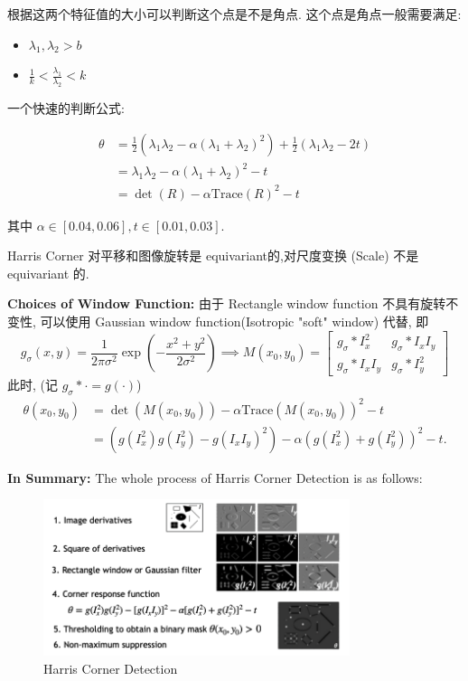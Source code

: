 根据这两个特征值的大小可以判断这个点是不是角点. 这个点是角点一般需要满足:

\begin{itemize}
    \item $\lambda_1, \lambda_2>b$
    \item $\frac{1}{k}<\frac{\lambda_1}{\lambda_2}<k$
\end{itemize}

一个快速的判断公式:

\begin{equation}
\begin{aligned}
\theta&=\frac 12(\lambda_1\lambda_2-\alpha(\lambda_1+\lambda_2)^2)+\frac12(\lambda_1\lambda_2-2t)\\
&=\lambda_1\lambda_2-\alpha(\lambda_1+\lambda_2)^2-t\\
&=\det(R)-\alpha\text{Trace}(R)^2-t
\end{aligned}
\end{equation}

其中 $\alpha\in[0.04,0.06], t\in[0.01,0.03]$.

Harris Corner 对平移和图像旋转是 equivariant的,对尺度变换 (Scale) 不是 equivariant 的.

\textbf{Choices of Window Function:} 由于 Rectangle window function 不具有旋转不变性, 可以使用 Gaussian window function(Isotropic "soft" window) 代替, 即
\[
    g_\sigma(x,y)=\frac{1}{2\pi\sigma^2}\exp\left( -\frac{x^2+y^2}{2\sigma^2} \right) \implies M(x_0, y_0) = \begin{bmatrix}
        g_\sigma \ast I_x^2 & g_\sigma \ast I_xI_y \\ g_\sigma \ast I_xI_y & g_\sigma \ast I_y^2 
    \end{bmatrix}
\]
此时, (记 $g_\sigma \ast \cdot = g(\cdot)$)
\begin{align*}
    \theta(x_0, y_0) &= \det(M(x_0, y_0)) - \alpha \text{Trace}(M(x_0, y_0))^2 - t \\
    &= \left(g(I_x^2) g(I_y^2) - g(I_xI_y)^2\right) - \alpha \left(g(I_x^2) + g(I_y^2)\right)^2 - t.
\end{align*}

\textbf{In Summary:} The whole process of Harris Corner Detection is as follows:
\begin{figure}[htbp]
    \centering
    \includegraphics[width=0.8\textwidth]{figures/Harris_process.png}
    \caption{Harris Corner Detection}
\end{figure}
